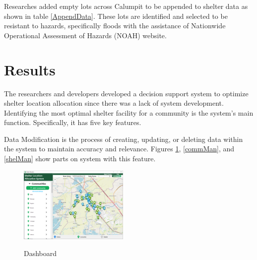 \documentclass[12pt,a4paper,]{article}
\begin{document}
	Researches added empty lots across Calumpit to be appended to shelter data as shown in table \ref{AppendData}. These lots are identified and selected to be resistant to hazards, specifically floods with the assistance of Nationwide Operational Assessment of Hazards (NOAH) website. 
	
	\begin{table}[h]
		\centering
		\caption{Sources of Appended Shelter Data}
		\label{AppendData}
	\end{table}
	
\section{Results}
	The researchers and developers developed a decision support system to optimize shelter location allocation since there was a lack of system development. Identifying the most optimal shelter facility for a community is the system's main function. Specifically, it has five key features.
	
	Data Modification is the process of creating, updating, or deleting data within the system to maintain accuracy and relevance. Figures \ref{db}, \ref{commMan}, and \ref{shelMan} show parts on system with this feature.
	
	\begin{figure}[h!]
		\caption{Dashboard}
		\centering
		\includegraphics[width=200px]{Chapter 4/dashboard}
		\label{db}
	\end{figure}
	
\end{document}
